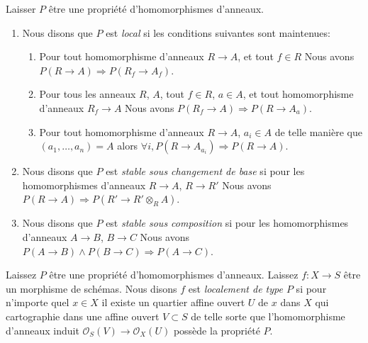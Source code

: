\begin{definition}

\label{definition-property-local}

Laisser $P$ être une propriété d'homomorphismes d'anneaux.

\begin{enumerate}

\item Nous disons que $P$ est {\it local} si les conditions suivantes sont maintenues:

\begin{enumerate}

\item Pour tout homomorphisme d'anneaux $R \to A$, et tout $f \in R$ Nous avons
$P(R \to A) \Rightarrow P(R_f \to A_f)$.
\item Pour tous les anneaux $R$, $A$, tout $f \in R$, $a\in A$, et tout homomorphisme d'anneaux
$R_f \to A$ Nous avons $P(R_f \to A) \Rightarrow P(R \to A_a)$.
\item Pour tout homomorphisme d'anneaux $R \to A$, $a_i \in A$ de telle manière que
$(a_1, \ldots, a_n) = A$ alors
$\forall i, P(R \to A_{a_i}) \Rightarrow P(R \to A)$.

\end{enumerate}

\item Nous disons que $P$ est {\it stable sous changement de base} si pour les homomorphismes d'anneaux $R \to A$, $R \to R'$ Nous avons
$P(R \to A) \Rightarrow P(R' \to R' \otimes_R A)$.
\item Nous disons que $P$ est {\it stable sous composition} si pour les homomorphismes d'anneaux $A \to B$, $B \to C$ Nous avons
$P(A \to B) \wedge P(B \to C) \Rightarrow P(A \to C)$.

\end{enumerate}

\end{definition}

\begin{definition}

\label{definition-locally-P}
Laissez $P$ être une propriété d'homomorphismes d'anneaux. Laissez $f : X \to S$ être un morphisme de schémas. Nous disons $f$ est {\it localement de type $P$} si pour n'importe quel $x \in X$ il existe un quartier affine ouvert $U$ de $x$ dans $X$ qui cartographie dans une affine ouvert $V \subset S$ de telle sorte que l'homomorphisme d'anneaux induit $\mathcal{O}_S(V) \to \mathcal{O}_X(U)$ possède la propriété $P$.
\end{definition}

